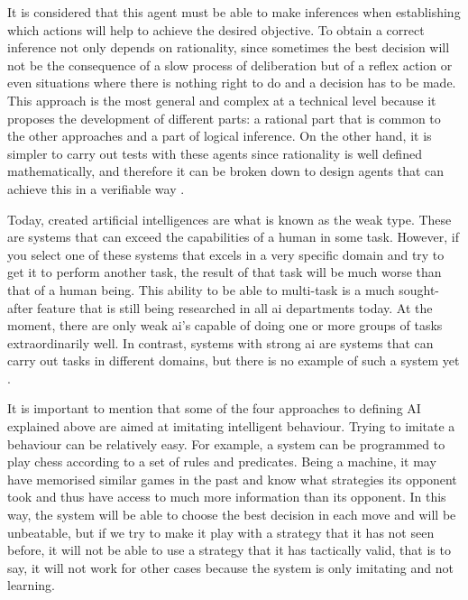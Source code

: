 \begin{enumerate}
It is considered that this agent must be able to make inferences when establishing which actions will help to achieve the desired objective. To obtain a correct inference not only depends on rationality, since sometimes the best decision will not be the consequence of a slow process of deliberation but of a reflex action or even situations where there is nothing right to do and a decision has to be made. This approach is the most general and complex at a technical level because it proposes the development of different parts: a rational part that is common to the other approaches and a part of logical inference. On the other hand, it is simpler to carry out tests with these agents since rationality is well defined mathematically, and therefore it can be broken down to design agents that can achieve this in a verifiable way \cite{amodernapproach}.

\end{enumerate}

Today, created artificial intelligences are what is known as the weak type. These are systems that can exceed the capabilities of a human in some task. However, if you select one of these systems that excels in a very specific domain and try to get it to perform another task, the result of that task will be much worse than that of a human being. This ability to be able to multi-task is a much sought-after feature that is still being researched in all \acrshort{ai} departments today. At the moment, there are only weak \acrshort{ai}'s capable of doing one or more groups of tasks extraordinarily well. In contrast, systems with strong \acrshort{ai} are systems that can carry out tasks in different domains, but there is no example of such a system yet \cite{amodernapproach}.
\newline

It is important to mention that some of the four approaches to defining AI explained above are aimed at imitating intelligent behaviour. Trying to imitate a behaviour can be relatively easy. For example, a system can be programmed to play chess according to a set of rules and predicates. Being a machine, it may have memorised similar games in the past and know what strategies its opponent took and thus have access to much more information than its opponent. In this way, the system will be able to choose the best decision in each move and will be unbeatable, but if we try to make it play with a strategy that it has not seen before, it will not be able to use a strategy that it has tactically valid, that is to say, it will not work for other cases because the system is only imitating and not learning.
\newline

